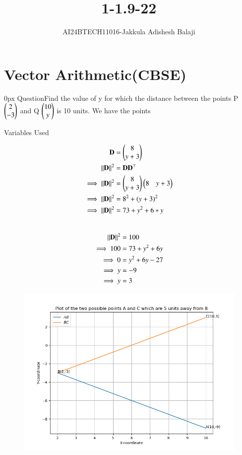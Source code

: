 \documentclass[journal]{IEEEtran}
\begin{document}

\renewcommand{\thefigure}{\theenumi}
\renewcommand{\thetable}{\theenumi}
\setlength{\intextsep}{10pt} %
\renewcommand{\thetable}{\theenumi}
\title{1-1.9-22}

\author{AI24BTECH11016-Jakkula Adishesh Balaji}
\maketitle
\bigskip
\section*{\textbf{Vector Arithmetic(CBSE)}}
         \parindent 0px
         QuestionFind the value of y for which the distance between the points P $\begin{pmatrix}2 \\ -3\end{pmatrix}$ and Q $\begin{pmatrix}10 \\ y\end{pmatrix}$ is 10 units.
\solution We have the points \\
	\begin{table}[h!]
         	\centering
         	
         	\caption{Variables Used}
         	\label{tab1.9.22}
         \end{table}
         \begin{align}
         	\mathbf{D}	&= \begin{pmatrix}8\\y+3\end{pmatrix} \\
		\left\lVert\mathbf{D}\right\rVert^2 &= \mathbf{D}\mathbf{D}^\top \\
		\implies \left\lVert\mathbf{D}\right\rVert^2 &= \begin{pmatrix}8\\y+3\end{pmatrix}\begin{pmatrix}8 & y+3\end{pmatrix} \\
		\implies \left\lVert\mathbf{D}\right\rVert^2 &= 8^{2} + \left(y+3\right)^{2} \\
		\implies \left\lVert\mathbf{D}\right\rVert^2 &= 73 + y^{2} + 6*y \\
	\end{align}
	 \\
	\begin{align}
	\left\lVert\mathbf{D}\right\rVert^2 &= 100 	 \\
        \implies 100 &= 73 + y^{2} + 6y \\
	\implies 0 &= y^2 + 6y -27 \\
  	\implies y &= -9 \\
 	\implies y &= 3 \\
	\end{align}
	\begin{figure}[h]
		\centering
		\includegraphics[scale=0.6]{figs/plot.png}
		\label{Fig}
	\end{figure}
\end{document}
